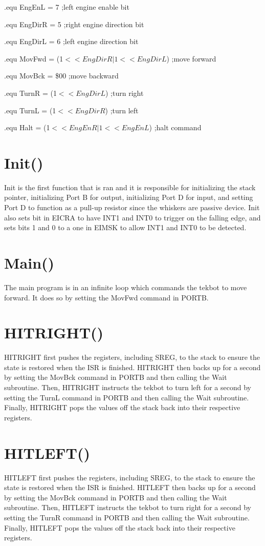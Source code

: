 \documentclass[12pt,letterpaper]{article}
\begin{document}
	.equ  EngEnL = 7					\hfill	;left engine enable bit
	
	.equ  EngDirR = 5					\hfill	;right engine direction bit
	
	.equ  EngDirL = 6					\hfill	;left engine direction bit
	
	.equ  MovFwd = (1$<<EngDirR|1<<EngDirL$) \hfill  ;move forward
	
	.equ  MovBck = \$00					\hfill	;move backward
	
	.equ  TurnR = (1$<<EngDirL$)			\hfill	;turn right
	
	.equ  TurnL = (1$<<EngDirR$)			\hfill	;turn left	
	
	.equ  Halt = (1$<<EngEnR|1<<EngEnL$)	\hfill	;halt command
	
\section{Init()}
	Init is the first function that is ran and it is responsible for initializing the stack pointer, initializing Port B for output, initializing Port D for input, and setting Port D to function as a pull-up resistor since the whiskers are passive device.
	Init also sets bit in EICRA to have INT1 and INT0 to trigger on the falling edge, and sets bits 1 and 0 to a one in EIMSK to allow INT1 and INT0 to be detected.
	
\section{Main()}
	The main program is in an infinite loop which commands the tekbot to move forward.
	It does so by setting the MovFwd command in PORTB.

\section{HITRIGHT()}
	HITRIGHT first pushes the registers, including SREG, to the stack to ensure the state is restored when the ISR is finished.
	HITRIGHT then backs up for a second by setting the MovBck command in PORTB and then calling the Wait subroutine.
	Then, HITRIGHT instructs the tekbot to turn left for a second by setting the TurnL command in PORTB and then calling the Wait subroutine.
	Finally, HITRIGHT pops the values off the stack back into their respective registers.

\section{HITLEFT()}
	HITLEFT first pushes the registers, including SREG, to the stack to ensure the state is restored when the ISR is finished.
	HITLEFT then backs up for a second by setting the MovBck command in PORTB and then calling the Wait subroutine.
	Then, HITLEFT instructs the tekbot to turn right for a second by setting the TurnR command in PORTB and then calling the Wait subroutine.
	Finally, HITLEFT pops the values off the stack back into their respective registers.
	
\end{document}
